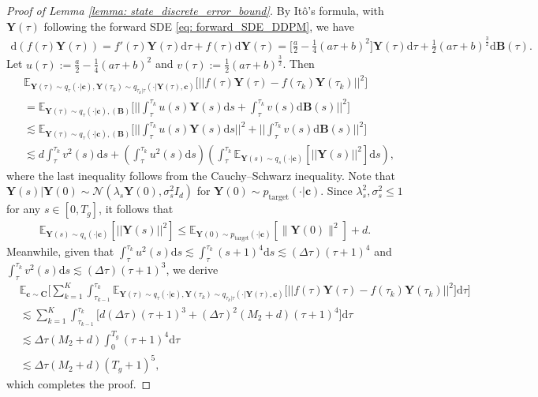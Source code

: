 \documentclass[11pt]{article}
\newcommand{\mE}{\mathbb{E}}
\newcommand{\bY}{\mathbf{Y}}
\newcommand{\bc}{\mathbf{c}}
\newcommand{\bB}{\mathbf{B}}
\newcommand{\bC}{\mathbf{C}}
\newcommand{\tar}{{\text{target}}}
\newcommand{\intd}{\mathrm{d}}
\begin{document}
\begin{proof}[Proof of Lemma \ref{lemma: state_discrete_error_bound}]
By It\^{o}'s formula, with $\bY(\tau)$ following the forward SDE \eqref{eq: forward_SDE_DDPM}, we have
\begin{align*}
    \intd(f(\tau)\bY(\tau)) = f'(\tau)\bY(\tau)\intd\tau + f(\tau)\intd\bY(\tau) = \bigg[\frac{a}{2} - \frac{1}{4}(a\tau + b)^2\bigg]\bY(\tau)\intd\tau + \frac{1}{2}(a\tau + b)^{\frac{3}{2}}\intd \bB(\tau).
\end{align*}
Let $u(\tau) := \frac{a}{2} - \frac{1}{4}(a\tau + b)^2$ and $v(\tau):=\frac{1}{2}(a\tau + b)^{\frac{3}{2}}$. Then
\begin{align*}
    &\mE_{\bY(\tau)\sim q_\tau(\cdot | \bc), \bY(\tau_k)\sim q_{\tau_k | \tau}(\cdot | \bY(\tau), \bc)}\big[||f(\tau)\bY(\tau) - f(\tau_k)\bY(\tau_k)||^2\big] \\
    &= \mE_{\bY(\tau)\sim q_\tau(\cdot | \bc), (\bB)} \bigg[\bigg|\bigg|\int_{\tau}^{\tau_k}u(s)\bY(s)\intd s + \int_{\tau}^{\tau_k}v(s)\intd\bB(s)\bigg|\bigg|^2\bigg] \\
    &\lesssim \mE_{\bY(\tau)\sim q_\tau(\cdot | \bc), (\bB)} \bigg[\bigg|\bigg|\int_{\tau}^{\tau_k}u(s)\bY(s)\intd s\bigg|\bigg|^2 + \bigg|\bigg|\int_{\tau}^{\tau_k}v(s)\intd\bB(s)\bigg|\bigg|^2\bigg] \\
    &\lesssim  d\int_{\tau}^{\tau_k}v^2(s) \intd s+ \left(\int_{\tau}^{\tau_k}u^2(s)\intd s\right)\left(\int_{\tau}^{\tau_k}\mE_{\bY(s)\sim q_s(\cdot | \bc)}[||\bY(s)||^2]\intd s\right) ,
\end{align*}
where the last inequality follows from the Cauchy--Schwarz inequality. Note that  $\bY(s) | \bY(0) \sim \mathcal{N}(\lambda_s\bY(0), \sigma_s^2I_d)$ for $\bY(0)\sim p_\tar(\cdot | \bc)$. Since $\lambda^2_s, \sigma_s^2\le 1$ for any $s\in[0, T_g]$, it follows that
\begin{align*}
    \mE_{\bY(s)\sim q_s(\cdot | \bc)}[||\bY(s)||^2] \le \mE_{\bY(0)\sim p_\tar(\cdot | \bc)}[\|\bY(0)\|^2 ] + d.
\end{align*}
Meanwhile, given that $\int_{\tau}^{\tau_k}u^2(s)\intd s \lesssim \int_{\tau}^{\tau_k}(s + 1)^4\intd s \lesssim (\Delta\tau)(\tau + 1)^4$ and $\int_{\tau}^{\tau_k}v^2(s)\intd s \lesssim (\Delta\tau)(\tau + 1)^3$, we derive
\begin{align*}
    & \mE_{\bc\sim\bC}\bigg[\sum_{k=1}^{K} \int_{\tau_{k - 1}}^{\tau_k} \mE_{\bY(\tau)\sim q_\tau(\cdot | \bc), \bY(\tau_k)\sim q_{\tau_k | \tau}(\cdot | \bY(\tau), \bc)}\big[||f(\tau)\bY(\tau) - f(\tau_k)\bY(\tau_k)||^2\big]\intd\tau\bigg] \\
    &\lesssim \sum_{k=1}^{K} \int_{\tau_{k - 1}}^{\tau_k} \bigg[d(\Delta\tau)(\tau + 1)^3 +(\Delta\tau)^2 (M_2 + d)(\tau + 1)^4\bigg]\intd\tau \\
    &\lesssim \Delta\tau(M_2 + d)\int_{0}^{T_g}(\tau + 1)^4\intd \tau\\
    &\lesssim \Delta\tau(M_2 + d)(T_g + 1)^5,
\end{align*}
which completes the proof.
\end{proof}
\end{document}
